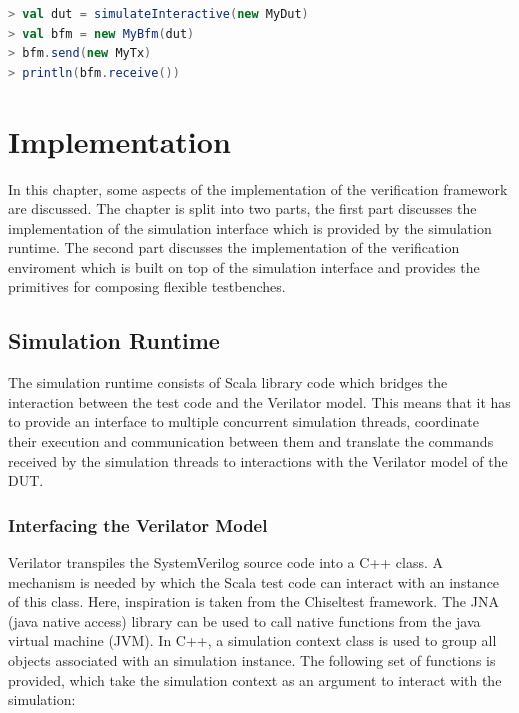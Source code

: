 \begin{listing}
\begin{lstlisting}[language=scala, captionpos=b, caption=Outline of an interactive debugging approach using the Scala REPL.,label=lst:debug_syntax]
> val dut = simulateInteractive(new MyDut)
> val bfm = new MyBfm(dut)
> bfm.send(new MyTx)
> println(bfm.receive())
\end{lstlisting}
\end{listing}

\chapter{Implementation} %

In this chapter, some aspects of the implementation of the verification framework are discussed. The chapter is split into two parts, the first part discusses the implementation of the simulation interface which is provided by the simulation runtime. The second part discusses the implementation of the verification enviroment which is built on top of the simulation interface and provides the primitives for composing flexible testbenches.



\section{Simulation Runtime} %

The simulation runtime consists of Scala library code which bridges the interaction between the test code and the Verilator model. This means that it has to provide an interface to multiple concurrent simulation threads, coordinate their execution and communication between them and translate the commands received by the simulation threads to interactions with the Verilator model of the DUT.

\subsection{Interfacing the Verilator Model} %

Verilator transpiles the SystemVerilog source code into a C++ class. A mechanism is needed by which the Scala test
code can interact with an instance of this class. Here, inspiration is taken from the Chiseltest framework. The JNA (java native access) library can be used to call native
functions from the java virtual machine (JVM). In C++, a simulation context class is used to group all objects associated with an simulation instance. The following set of functions is provided, which take the simulation context as an argument to interact
with the simulation:

